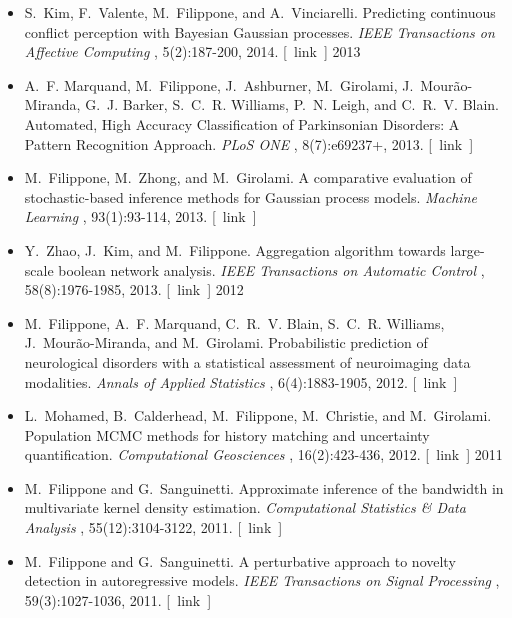 \documentclass[10pt]{article}
\begin{document}
\begin{itemize}
\item 

  S. Kim, F. Valente, M. Filippone, and A. Vinciarelli. Predicting continuous conflict perception with Bayesian Gaussian processes. \emph{IEEE Transactions on Affective Computing}
, 5(2):187-200, 2014. [ link ] 
2013
\item 

  A. F. Marquand, M. Filippone, J. Ashburner, M. Girolami, J. Mour\~ao-Miranda, G. J. Barker, S. C. R. Williams, P. N. Leigh, and C. R. V. Blain. Automated, High Accuracy Classification of Parkinsonian Disorders: A Pattern Recognition Approach. \emph{PLoS ONE}
, 8(7):e69237+, 2013. [ link ] 

\item 

  M. Filippone, M. Zhong, and M. Girolami. A comparative evaluation of stochastic-based inference methods for Gaussian process models. \emph{Machine Learning}
, 93(1):93-114, 2013. [ link ] 

\item 

  Y. Zhao, J. Kim, and M. Filippone. Aggregation algorithm towards large-scale boolean network analysis. \emph{IEEE Transactions on Automatic Control}
, 58(8):1976-1985, 2013. [ link ] 
2012
\item 

  M. Filippone, A. F. Marquand, C. R. V. Blain, S. C. R. Williams, J. Mour\~ao-Miranda, and M. Girolami. Probabilistic prediction of neurological disorders with a statistical assessment of neuroimaging data modalities. \emph{Annals of Applied Statistics}
, 6(4):1883-1905, 2012. [ link ] 

\item 

  L. Mohamed, B. Calderhead, M. Filippone, M. Christie, and M. Girolami. Population MCMC methods for history matching and uncertainty quantification. \emph{Computational Geosciences}
, 16(2):423-436, 2012. [ link ] 
2011
\item 

  M. Filippone and G. Sanguinetti. Approximate inference of the bandwidth in multivariate kernel density estimation. \emph{Computational Statistics \& Data Analysis}
, 55(12):3104-3122, 2011. [ link ] 

\item 

  M. Filippone and G. Sanguinetti. A perturbative approach to novelty detection in autoregressive models. \emph{IEEE Transactions on Signal Processing}
, 59(3):1027-1036, 2011. [ link ] 


\end{itemize}
\end{document}
